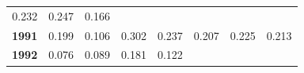 \documentclass[]{article}
\begin{document}
\begin{longtable}[]{@{}rrrrrrrr@{}}
\begin{minipage}[t]{0.09\columnwidth}
0.232\strut
\end{minipage} & \begin{minipage}[t]{0.08\columnwidth}\raggedleft\strut
0.247\strut
\end{minipage} & \begin{minipage}[t]{0.10\columnwidth}\raggedleft\strut
0.166\strut
\end{minipage}\tabularnewline
\begin{minipage}[t]{0.08\columnwidth}\raggedleft\strut
\textbf{1991}\strut
\end{minipage} & \begin{minipage}[t]{0.10\columnwidth}\raggedleft\strut
0.199\strut
\end{minipage} & \begin{minipage}[t]{0.11\columnwidth}\raggedleft\strut
0.106\strut
\end{minipage} & \begin{minipage}[t]{0.08\columnwidth}\raggedleft\strut
0.302\strut
\end{minipage} & \begin{minipage}[t]{0.14\columnwidth}\raggedleft\strut
0.237\strut
\end{minipage} & \begin{minipage}[t]{0.09\columnwidth}\raggedleft\strut
0.207\strut
\end{minipage} & \begin{minipage}[t]{0.08\columnwidth}\raggedleft\strut
0.225\strut
\end{minipage} & \begin{minipage}[t]{0.10\columnwidth}\raggedleft\strut
0.213\strut
\end{minipage}\tabularnewline
\begin{minipage}[t]{0.08\columnwidth}\raggedleft\strut
\textbf{1992}\strut
\end{minipage} & \begin{minipage}[t]{0.10\columnwidth}\raggedleft\strut
0.076\strut
\end{minipage} & \begin{minipage}[t]{0.11\columnwidth}\raggedleft\strut
0.089\strut
\end{minipage} & \begin{minipage}[t]{0.08\columnwidth}\raggedleft\strut
0.181\strut
\end{minipage} & \begin{minipage}[t]{0.14\columnwidth}\raggedleft\strut
0.122\strut
\end{minipage} & \begin{minipage}[t]{0.09\columnwidth}\raggedleft\strut

\end{minipage}
\end{longtable}
\end{document}
